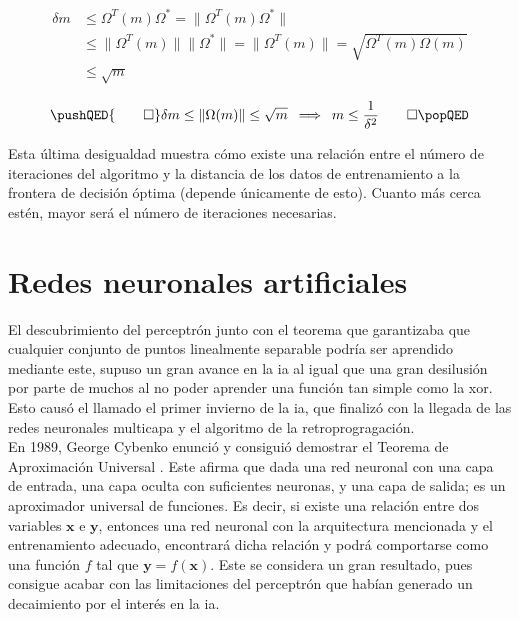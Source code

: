 		\begin{align*}
			\boxed{\delta m} &\leq \Omega^T(m)\Omega^* = \|\Omega^T(m)\Omega^*\|\\
			&\leq \|\Omega^T(m)\| \|\Omega^*\| = \|\Omega^T(m)\| = \sqrt{\Omega^T(m)\Omega(m)}\\
			& \leq \boxed{\sqrt{m}} 
		\end{align*}
		
		$$
		\pushQED{\qed} 
		\delta m \leq \|\Omega(m)\| \leq \sqrt{m} \,\,\, \Longrightarrow \,\,\, m \leq \frac{1}{\delta^2}\qedhere
		\popQED
		$$ 
		
		Esta última desigualdad muestra cómo existe una relación entre el número de iteraciones del algoritmo y la distancia de los datos de entrenamiento a la frontera de decisión óptima (depende únicamente de esto). Cuanto más cerca estén, mayor será el número de iteraciones necesarias. 
		
	\section{Redes neuronales artificiales}
	
		El descubrimiento del perceptrón junto con el teorema que garantizaba que cualquier conjunto de puntos linealmente separable podría ser aprendido mediante este, supuso un gran avance en la \gls{ia} al igual que una gran desilusión por parte de muchos al no poder aprender una función tan simple como la \gls{xor}. Esto causó el llamado el primer invierno de la \gls{ia}, que finalizó con la llegada de las redes neuronales multicapa y el algoritmo de la retroprogragación. \\
		
		En 1989, George Cybenko enunció y consiguió demostrar el Teorema de Aproximación Universal \cite{teoremaAproximacion}. Este afirma que dada una red neuronal con una capa de entrada, una capa oculta con suficientes neuronas, y una capa de salida; es un aproximador universal de funciones. Es decir, si existe una relación entre dos variables $\textbf{x}$ e $\textbf{y}$, entonces una red neuronal con la arquitectura mencionada y el entrenamiento adecuado, encontrará dicha relación y podrá comportarse como una función $f$ tal que $\textbf{y} = f(\textbf{x})$. Este se considera un gran resultado, pues consigue acabar con las limitaciones del perceptrón que habían generado un decaimiento por el interés en la \gls{ia}. \\
		
